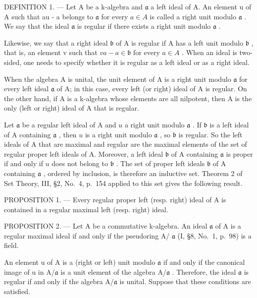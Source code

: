 DEFINITION 1. --- Let A be a k-algebra and \(\mathfrak{a}\) a left ideal of A. An element u of A such that au - a belongs to \(\mathfrak{a}\) for every \(a \in A\) is called a right unit modulo \(\mathfrak{a}\) . We say that the ideal \(\mathfrak{a}\) is regular if there exists a right unit modulo \(\mathfrak{a}\) .

Likewise, we say that a right ideal \(\mathfrak{b}\) of A is regular if A has a left unit modulo \(\mathfrak{b}\) , that is, an element v such that \(va - a \in \mathfrak{b}\) for every \(a \in A\) . When an ideal is two-sided, one needs to specify whether it is regular as a left ideal or as a right ideal.

When the algebra A is unital, the unit element of A is a right unit modulo \(\mathfrak{a}\) for every left ideal \(\mathfrak{a}\) of A; in this case, every left (or right) ideal of A is regular. On the other hand, if A is a k-algebra whose elements are all nilpotent, then A is the only (left or right) ideal of A that is regular.

Let \(\mathfrak{a}\) be a regular left ideal of A and \(u\) a right unit modulo \(\mathfrak{a}\) . If \(\mathfrak{b}\) is a left ideal of A containing \(\mathfrak{a}\) , then \(u\) is a right unit modulo \(\mathfrak{a}\) , so \(\mathfrak{b}\) is regular. So the left ideals of A that are maximal and regular are the maximal elements of the set of regular proper left ideals of A. Moreover, a left ideal \(\mathfrak{b}\) of A containing \(\mathfrak{a}\) is proper if and only if \(u\) does not belong to \(\mathfrak{b}\) . The set of proper left ideals \(\mathfrak{b}\) of A containing \(\mathfrak{a}\) , ordered by inclusion, is therefore an inductive set. Theorem 2 of Set Theory, III, §2, No.~4, p.~154 applied to this set gives the following result.

PROPOSITION 1. --- Every regular proper left (resp. right) ideal of A is contained in a regular maximal left (resp. right) ideal.

PROPOSITION 2. --- Let A be a commutative k-algebra. An ideal \(\mathfrak{a}\) of A is a regular maximal ideal if and only if the pseudoring A/ \(\mathfrak{a}\) (I, §8, No.~1, p.~98) is a field.

An element u of A is a (right or left) unit modulo \(\mathfrak{a}\) if and only if the canonical image of u in A/\(\mathfrak{a}\) is a unit element of the algebra A/\(\mathfrak{a}\) . Therefore, the ideal \(\mathfrak{a}\) is regular if and only if the algebra A/\(\mathfrak{a}\) is unital. Suppose that these conditions are satisfied.

